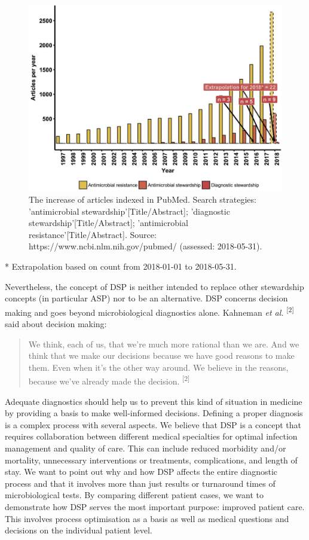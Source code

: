 \documentclass[
]{book}
\begin{document}
\begin{figure}

{\centering \includegraphics[width=0.8\linewidth]{images/02-01} 

}

\caption{The increase of articles indexed in PubMed. Search strategies: 'antimicrobial stewardship'[Title/Abstract]; 'diagnostic stewardship'[Title/Abstract]; 'antimicrobial resistance'[Title/Abstract]. Source: https://www.ncbi.nlm.nih.gov/pubmed/ (assessed: 2018-05-31).}\label{fig:fig2-1}
\end{figure}

* Extrapolation based on count from 2018-01-01 to 2018-05-31.

Nevertheless, the concept of DSP is neither intended to replace other stewardship concepts (in particular ASP) nor to be an alternative. DSP concerns decision making and goes beyond microbiological diagnostics alone. Kahneman \emph{et al.} \textsuperscript{{[}2{]}} said about decision making:

\begin{quote}
We think, each of us, that we're much more rational than we are. And we think that we make our decisions because we have good reasons to make them. Even when it's the other way around. We believe in the reasons, because we've already made the decision. \textsuperscript{{[}2{]}}
\end{quote}

Adequate diagnostics should help us to prevent this kind of situation in medicine by providing a basis to make well-informed decisions. Defining a proper diagnosis is a complex process with several aspects. We believe that DSP is a concept that requires collaboration between different medical specialties for optimal infection management and quality of care. This can include reduced morbidity and/or mortality, unnecessary interventions or treatments, complications, and length of stay. We want to point out why and how DSP affects the entire diagnostic process and that it involves more than just results or turnaround times of microbiological tests. By comparing different patient cases, we want to demonstrate how DSP serves the most important purpose: improved patient care. This involves process optimisation as a basis as well as medical questions and decisions on the individual patient level.
\end{document}
